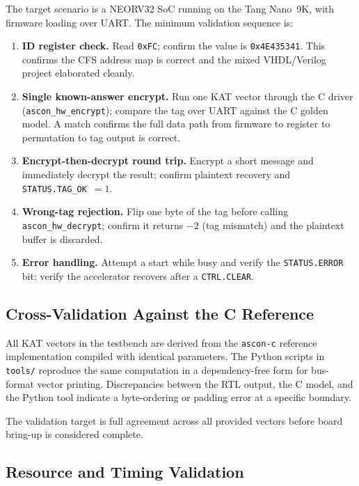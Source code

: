\documentclass[11pt,a4paper]{article}
\begin{document}
The target scenario is a NEORV32 SoC running on the Tang Nano~9K, with
firmware loading over UART. The minimum validation sequence is:

\begin{enumerate}
  \item \textbf{ID register check.} Read \texttt{0xFC}; confirm the value is
        \texttt{0x4E435341}. This confirms the CFS address map is correct
        and the mixed VHDL/Verilog project elaborated cleanly.
  \item \textbf{Single known-answer encrypt.} Run one KAT vector through the
        C driver (\texttt{ascon\_hw\_encrypt}); compare the tag over UART against
        the C golden model. A match confirms the full data path from firmware
        to register to permutation to tag output is correct.
  \item \textbf{Encrypt-then-decrypt round trip.} Encrypt a short message and
        immediately decrypt the result; confirm plaintext recovery and
        \texttt{STATUS.TAG\_OK}~$= 1$.
  \item \textbf{Wrong-tag rejection.} Flip one byte of the tag before calling
        \texttt{ascon\_hw\_decrypt}; confirm it returns $-2$ (tag mismatch)
        and the plaintext buffer is discarded.
  \item \textbf{Error handling.} Attempt a start while busy and verify the
        \texttt{STATUS.ERROR} bit; verify the accelerator recovers after
        a \texttt{CTRL.CLEAR}.
\end{enumerate}

\subsection{Cross-Validation Against the C Reference}

All KAT vectors in the testbench are derived from the \texttt{ascon-c}
reference implementation compiled with identical parameters. The Python
scripts in \texttt{tools/} reproduce the same computation in a dependency-free
form for bus-format vector printing. Discrepancies between the RTL output,
the C model, and the Python tool indicate a byte-ordering or padding error
at a specific boundary.

The validation target is full agreement across all provided vectors
before board bring-up is considered complete.

\subsection{Resource and Timing Validation}
\end{document}
